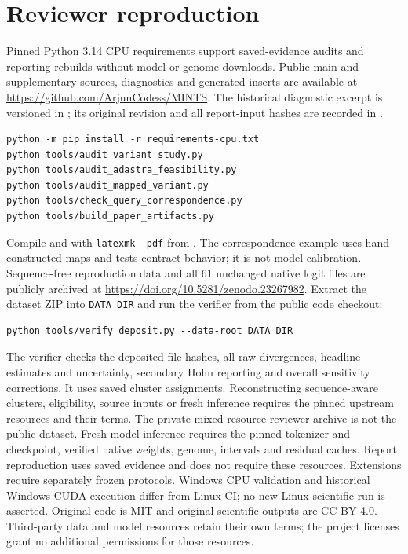 \documentclass[10pt,letterpaper]{article}
\begin{document}
\section{Reviewer reproduction}
Pinned Python 3.14 CPU requirements support saved-evidence audits and reporting rebuilds without model or genome downloads. Public main and supplementary sources, diagnostics and generated inserts are available at \url{https://github.com/ArjunCodess/MINTS}. The historical diagnostic excerpt is versioned in ; its original revision and all report-input hashes are recorded in .
\begin{verbatim}
python -m pip install -r requirements-cpu.txt
python tools/audit_variant_study.py
python tools/audit_adastra_feasibility.py
python tools/audit_mapped_variant.py
python tools/check_query_correspondence.py
python tools/build_paper_artifacts.py
\end{verbatim}
Compile  and  with \texttt{latexmk -pdf} from . The correspondence example uses hand-constructed maps and tests contract behavior; it is not model calibration. Sequence-free reproduction data and all 61 unchanged native logit files are publicly archived at \url{https://doi.org/10.5281/zenodo.23267982}. Extract the dataset ZIP into \texttt{DATA\_DIR} and run the verifier from the public code checkout:
\begin{verbatim}
python tools/verify_deposit.py --data-root DATA_DIR
\end{verbatim}
The verifier checks the deposited file hashes, all raw divergences, headline estimates and uncertainty, secondary Holm reporting and overall sensitivity corrections. It uses saved cluster assignments. Reconstructing sequence-aware clusters, eligibility, source inputs or fresh inference requires the pinned upstream resources and their terms. The private mixed-resource reviewer archive is not the public dataset.
Fresh model inference requires the pinned tokenizer and checkpoint, verified native weights, genome, intervals and residual caches. Report reproduction uses saved evidence and does not require these resources. Extensions require separately frozen protocols. Windows CPU validation and historical Windows CUDA execution differ from Linux CI; no new Linux scientific run is asserted. Original code is MIT and original scientific outputs are CC-BY-4.0. Third-party data and model resources retain their own terms; the project licenses grant no additional permissions for those resources.
\end{document}
